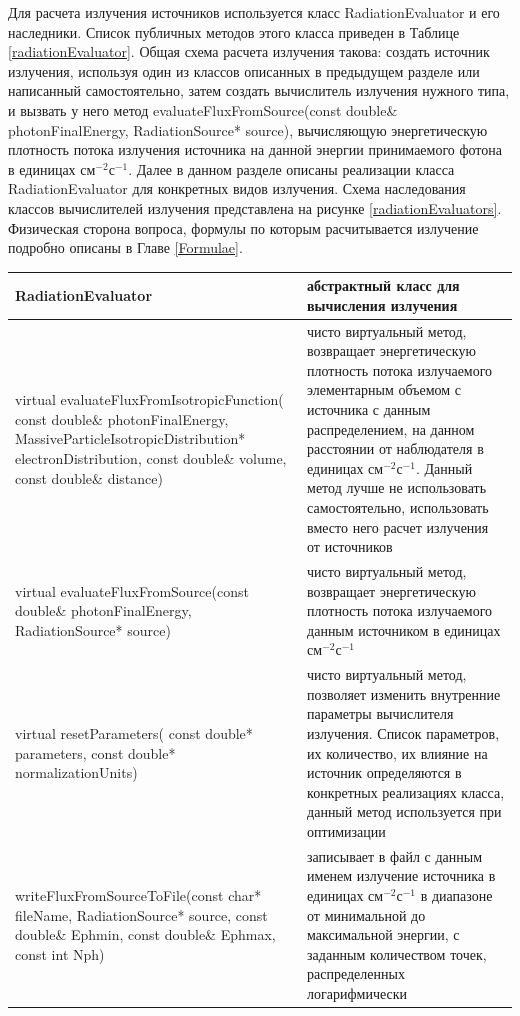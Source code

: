 Для расчета излучения источников используется класс RadiationEvaluator и его наследники. Список публичных методов этого класса приведен в Таблице \ref{radiationEvaluator}. Общая схема расчета излучения такова: создать источник излучения, используя один из классов описанных в предыдущем разделе или написанный самостоятельно, затем создать вычислитель излучения нужного типа, и вызвать у него метод evaluateFluxFromSource(const double\& photonFinalEnergy, RadiationSource* source), вычисляющую энергетическую плотность потока излучения источника на данной энергии принимаемого фотона в единицах  $\text{см}^{-2} \text{с}^{-1}$. Далее в данном разделе описаны реализации класса RadiationEvaluator для конкретных видов излучения. Схема наследования классов вычислителей излучения представлена на рисунке \ref{radiationEvaluators}. Физическая сторона вопроса, формулы по которым расчитывается излучение подробно описаны в Главе \ref{Formulae}.

\begin{small}
	\label{radiationEvaluator}
	\begin{xtabular}{|p{0.5\textwidth}|p{0.5\textwidth}|} 
		\hline
		\textbf{RadiationEvaluator} & абстрактный класс для вычисления излучения \\
		\hline
		virtual evaluateFluxFromIsotropicFunction( const double\& photonFinalEnergy, MassiveParticleIsotropicDistribution* electronDistribution, const double\& volume, const double\& distance) & чисто виртуальный метод, возвращает энергетическую плотность потока излучаемого элементарным объемом с источника с данным распределением, на данном расстоянии от наблюдателя в единицах $\text{см}^{-2} \text{с}^{-1}$. Данный метод лучше не использовать самостоятельно, использовать вместо него расчет излучения от источников\\
		\hline
		virtual evaluateFluxFromSource(const double\& photonFinalEnergy, RadiationSource* source) & чисто виртуальный метод, возвращает энергетическую плотность потока излучаемого данным источником в единицах $\text{см}^{-2} \text{с}^{-1}$ \\
		\hline
		virtual resetParameters( const double* parameters, const double* normalizationUnits) & чисто виртуальный метод, позволяет изменить внутренние параметры вычислителя излучения. Список параметров, их количество, их влияние на источник определяются  в конкретных реализациях класса, данный метод используется при оптимизации\\
		\hline
		writeFluxFromSourceToFile(const char* fileName, RadiationSource* source, const double\& Ephmin, const double\& Ephmax, const int Nph) & записывает в файл с данным именем излучение источника в единицах $\text{см}^{-2} \text{с}^{-1}$ в диапазоне от минимальной до максимальной энергии, с заданным количеством точек, распределенных логарифмически\\
		\hline
	\end{xtabular}
\end{small}

